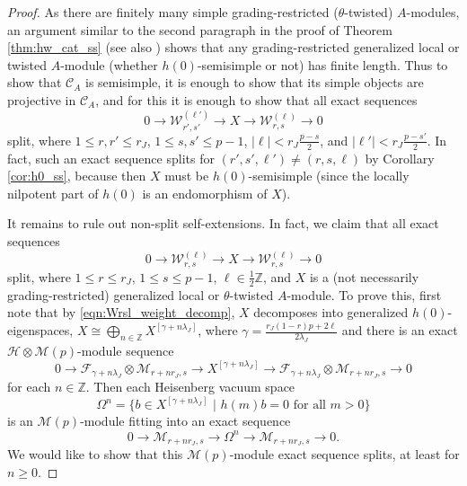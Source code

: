 \documentclass[11pt, reqno]{amsart}
\theoremstyle{definition}\newtheorem{defi}[thm]{Definition}
\theoremstyle{definition}\newtheorem{rem}[thm]{Remark}
\theoremstyle{definition}\newtheorem{exam}[thm]{Example}
\theoremstyle{definition}\newtheorem{assum}[thm]{Assumption}
\newcommand{\cH}{\mathcal{H}}
\newcommand{\cM}{\mathcal{M}}
\newcommand{\cF}{\mathcal{F}}
\newcommand{\cC}{\mathcal{C}}
\newcommand{\cW}{\mathcal{W}}
\newcommand{\ZZ}{\mathbb{Z}}
\begin{document}
\begin{proof}
As there are finitely many simple grading-restricted ($\theta$-twisted) $A$-modules, an argument similar to the second paragraph in the proof of Theorem \ref{thm:hw_cat_ss} (see also \cite[Proposition 3.15]{Hu-C2}) shows that any grading-restricted generalized local or twisted $A$-module (whether $h(0)$-semisimple or not) has finite length. Thus to show that $\cC_A$ is semisimple, it is enough to show that its simple objects are projective in $\cC_A$, and for this it is enough to show that all exact sequences
\begin{equation*}
0\longrightarrow\cW_{r', s'}^{(\ell')}\longrightarrow X\longrightarrow\cW_{r,s}^{(\ell)}\longrightarrow 0
\end{equation*}
split, where $1\leq r,r'\leq r_J$, $1\leq s,s'\leq p-1$, $\vert\ell\vert<r_J\frac{p-s}{2}$, and $\vert \ell'\vert < r_J\frac{p-s'}{2}$. In fact, such an exact sequence splits for $(r',s',\ell')\neq (r, s, \ell)$ by Corollary \ref{cor:h0_ss}, because then $X$ must be $h(0)$-semisimple (since the locally nilpotent part of $h(0)$ is an endomorphism of $X$). 

It remains to rule out non-split self-extensions. In fact, we claim that all exact sequences
\begin{equation*}
0\longrightarrow\cW_{r,s}^{(\ell)}\longrightarrow X\longrightarrow\cW_{r,s}^{(\ell)}\longrightarrow 0
\end{equation*}
split, where $1\leq r\leq r_J$, $1\leq s\leq p-1$, $\ell\in\frac{1}{2}\ZZ$, and $X$ is a (not necessarily grading-restricted) generalized local or $\theta$-twisted $A$-module. To prove this, first note that by \eqref{eqn:Wrsl_weight_decomp}, $X$ decomposes into generalized $h(0)$-eigenspaces, $X\cong\bigoplus_{n\in\ZZ} X^{[\gamma+n\lambda_J]}$, where $\gamma=\frac{r_J(1-r)p+2\ell}{2\lambda_J}$ and there is an exact $\cH\otimes\cM(p)$-module sequence
\begin{equation*}
0\longrightarrow\cF_{\gamma+n\lambda_J}\otimes\cM_{r+nr_J,s}\longrightarrow X^{[\gamma+n\lambda_J]}\longrightarrow\cF_{\gamma+n\lambda_J}\otimes\cM_{r+nr_J,s}\longrightarrow 0
\end{equation*}
for each $n\in\ZZ$. Then each Heisenberg vacuum space
\begin{equation*}
\Omega^n =\lbrace b\in X^{[\gamma+n\lambda_J]}\,\,\vert\,\,h(m)b=0\,\,\text{for all}\,\,m>0\rbrace
\end{equation*}
is an $\cM(p)$-module fitting into an exact sequence
\begin{equation*}
0\longrightarrow\cM_{r+nr_J,s}\longrightarrow \Omega^n\longrightarrow\cM_{r+nr_J,s}\longrightarrow 0.
\end{equation*}
We would like to show that this $\cM(p)$-module exact sequence splits, at least for $n\geq 0$.


\end{proof}
\end{document}

